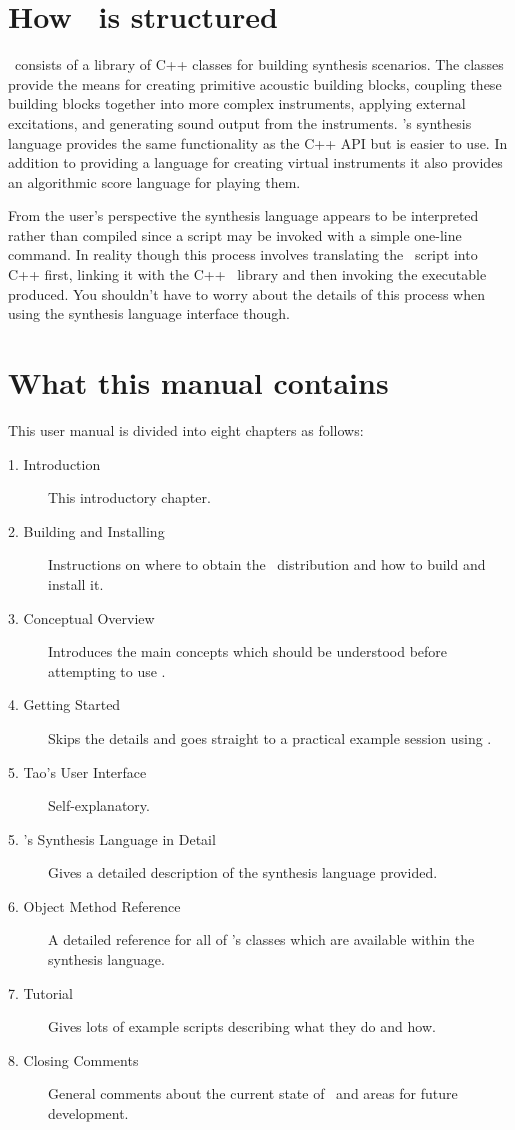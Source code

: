 \section{How \tao\ is structured}
\tao\ consists of a library of C++ classes for building synthesis
scenarios. The classes provide the means for creating
primitive acoustic building blocks, coupling these building blocks together
into more complex instruments, applying external excitations, and
generating sound output from the instruments. \tao's synthesis language
provides the same functionality as the C++ API but is easier to use. In
addition to providing a language for creating virtual instruments it
also provides an algorithmic score language for playing them. 

From the user's perspective the synthesis language appears to be interpreted
rather than compiled since a script may be invoked with a simple one-line
command. In reality though this process involves translating the \tao\
script into C++ first, linking it with the C++ \tao\ library
 and then invoking the executable produced. You
shouldn't have to worry about the details of this process when using the
synthesis language interface though.

\section{What this manual contains}
This user manual is divided into eight chapters as follows:

\begin{description}
\item[1. Introduction] This introductory chapter.
\item[2. Building and Installing \tao] Instructions on where
to obtain the \tao\ distribution and how to build and install it.
\item[3. Conceptual Overview] Introduces the main concepts which should
be understood before attempting to use \tao.
\item[4. Getting Started] Skips the details and goes straight to
a practical example session using \tao.
\item[5. Tao's User Interface] Self-explanatory.
\item[5. \tao's Synthesis Language in Detail] Gives a detailed description
of the synthesis language provided.
\item[6. Object Method Reference] A detailed reference for all of \tao's
classes which are available within the synthesis language. 
\item[7. Tutorial] Gives lots of example scripts describing what they
do and how.
\item[8. Closing Comments] General comments about the current state
of \tao\ and areas for future development. 
\end{description}

